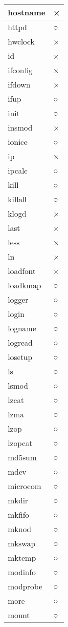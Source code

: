 \begin{longtable}{p{40mm}p{40mm}}
hostname & × \\ \hline
httpd & ○ \\ \hline
hwclock & × \\ \hline
id & × \\ \hline
ifconfig & × \\ \hline
ifdown & × \\ \hline
ifup &  ○ \\ \hline
init &  ○ \\ \hline
insmod & × \\ \hline
ionice &  ○ \\ \hline
ip & × \\ \hline
ipcalc &  ○ \\ \hline
kill &  ○ \\ \hline
killall & ○ \\ \hline
klogd & × \\ \hline
last & × \\ \hline
less & × \\ \hline
ln & × \\ \hline
loadfont & × \\ \hline
loadkmap &  ○ \\ \hline
logger &  ○ \\ \hline
login & ○ \\ \hline
logname & ○ \\ \hline
logread & ○ \\ \hline
losetup & ○ \\ \hline
ls &  ○ \\ \hline
lsmod & ○ \\ \hline
lzcat & ○ \\ \hline
lzma &  ○ \\ \hline
lzop &  ○ \\ \hline
lzopcat & ○ \\ \hline
md5sum &  ○ \\ \hline
mdev &  ○ \\ \hline
microcom &  ○ \\ \hline
mkdir & ○ \\ \hline
mkfifo &  ○ \\ \hline
mknod & ○ \\ \hline
mkswap &  ○ \\ \hline
mktemp &  ○ \\ \hline
modinfo & ○ \\ \hline
modprobe &  ○ \\ \hline
more &  ○ \\ \hline
mount & ○ \\ \hline

\end{longtable}
